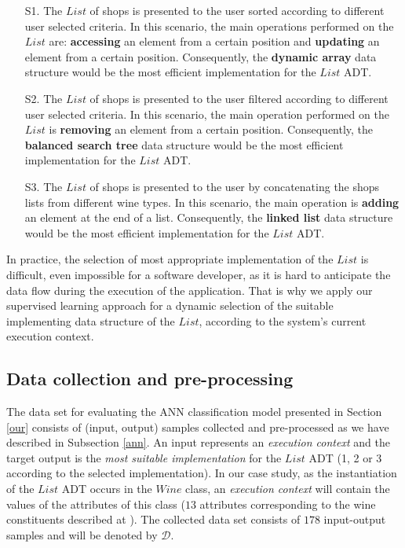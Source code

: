 \begin{enumerate}

\item [S1.] The $List$ of shops is presented to the user sorted according to different user selected criteria. In this scenario, the main operations performed on the $List$ are: \textbf{accessing} an element from a certain position and \textbf{updating} an element from a certain position. Consequently, the \textbf{dynamic array} data structure would be the most efficient implementation for the $List$ ADT.

\item [S2.] The $List$ of shops is presented to the user filtered according to different user selected criteria. In this scenario, the main operation performed on the $List$ is \textbf{removing} an element from a certain position. Consequently, the \textbf{balanced search tree} data structure would be the most efficient implementation for the $List$ ADT.

\item [S3.] The $List$ of shops is presented to the user by concatenating the shops lists from different wine types. In this scenario, the main operation is \textbf{adding} an element at the end of a list. Consequently, the \textbf{linked list} data structure would be the most efficient implementation for the $List$ ADT.

\end{enumerate}

In practice, the selection of most appropriate implementation of the $List$ is difficult, even impossible for a software developer, as it is hard to anticipate the data flow during the execution of the application. That is why we apply our supervised learning approach for a dynamic selection of the suitable implementing data structure of the $List$, according to the system's current execution context.

\subsection{Data collection and pre-processing}

The data set for evaluating the ANN classification model presented in Section \ref{our} consists of (input, output) samples collected and pre-processed as we have described in Subsection \ref{ann}. An input represents an \emph{execution context} and the target output is the \emph{most suitable implementation} for the $List$ ADT (1, 2 or 3 according to the selected implementation). In our case study, as the instantiation of the $List$ ADT occurs in the $Wine$ class, an \emph{execution context} will contain the values of the attributes of this class ($13$ attributes corresponding to the wine constituents described at \cite{website:wine}). The collected data set consists of $178$ input-output samples and will be denoted by $\mathcal{D}$.

